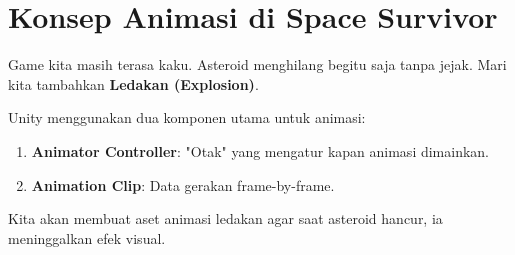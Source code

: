 
\section{Konsep Animasi di Space Survivor}

Game kita masih terasa kaku. Asteroid menghilang begitu saja tanpa jejak. Mari kita tambahkan \textbf{Ledakan (Explosion)}.

Unity menggunakan dua komponen utama untuk animasi:
\begin{enumerate}
    \item \textbf{Animator Controller}: "Otak" yang mengatur kapan animasi dimainkan.
    \item \textbf{Animation Clip}: Data gerakan frame-by-frame.
\end{enumerate}

Kita akan membuat aset animasi ledakan agar saat asteroid hancur, ia meninggalkan efek visual.
